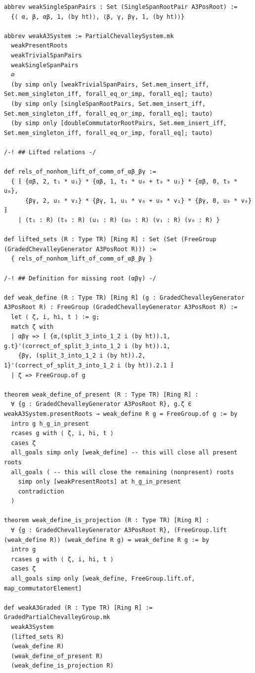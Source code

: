 \documentclass[10pt,a4paper]{article}
\begin{document}
\begin{Verbatim}
abbrev weakSingleSpanPairs : Set (SingleSpanRootPair A3PosRoot) :=
  {⟨ α, β, αβ, 1, (by ht)⟩, ⟨β, γ, βγ, 1, (by ht)⟩}

abbrev weakA3System := PartialChevalleySystem.mk
  weakPresentRoots
  weakTrivialSpanPairs
  weakSingleSpanPairs
  ∅
  (by simp only [weakTrivialSpanPairs, Set.mem_insert_iff, Set.mem_singleton_iff, forall_eq_or_imp, forall_eq]; tauto)
  (by simp only [singleSpanRootPairs, Set.mem_insert_iff, Set.mem_singleton_iff, forall_eq_or_imp, forall_eq]; tauto)
  (by simp only [doubleCommutatorRootPairs, Set.mem_insert_iff, Set.mem_singleton_iff, forall_eq_or_imp, forall_eq]; tauto)

/-! ## Lifted relations -/

def rels_of_nonhom_lift_of_comm_of_αβ_βγ :=
  { ⁅ {αβ, 2, t₁ * u₁} * {αβ, 1, t₁ * u₀ + t₀ * u₁} * {αβ, 0, t₀ * u₀},
      {βγ, 2, u₁ * v₁} * {βγ, 1, u₁ * v₀ + u₀ * v₁} * {βγ, 0, u₀ * v₀} ⁆
    | (t₁ : R) (t₀ : R) (u₁ : R) (u₀ : R) (v₁ : R) (v₀ : R) }

def lifted_sets (R : Type TR) [Ring R] : Set (Set (FreeGroup (GradedChevalleyGenerator A3PosRoot R))) :=
  { rels_of_nonhom_lift_of_comm_of_αβ_βγ }

/-! ## Definition for missing root (αβγ) -/

def weak_define (R : Type TR) [Ring R] (g : GradedChevalleyGenerator A3PosRoot R) : FreeGroup (GradedChevalleyGenerator A3PosRoot R) :=
  let ⟨ ζ, i, hi, t ⟩ := g;
  match ζ with
  | αβγ => ⁅ {α,(split_3_into_1_2 i (by ht)).1, g.t}'(correct_of_split_3_into_1_2 i (by ht)).1,
    {βγ, (split_3_into_1_2 i (by ht)).2, 1}'(correct_of_split_3_into_1_2 i (by ht)).2.1 ⁆
  | ζ => FreeGroup.of g

theorem weak_define_of_present (R : Type TR) [Ring R] :
  ∀ {g : GradedChevalleyGenerator A3PosRoot R}, g.ζ ∈ weakA3System.presentRoots → weak_define R g = FreeGroup.of g := by
  intro g h_g_in_present
  rcases g with ⟨ ζ, i, hi, t ⟩
  cases ζ
  all_goals simp only [weak_define] -- this will close all present roots
  all_goals ( -- this will close the remaining (nonpresent) roots
    simp only [weakPresentRoots] at h_g_in_present
    contradiction
  )

theorem weak_define_is_projection (R : Type TR) [Ring R] :
  ∀ {g : GradedChevalleyGenerator A3PosRoot R}, (FreeGroup.lift (weak_define R)) (weak_define R g) = weak_define R g := by
  intro g
  rcases g with ⟨ ζ, i, hi, t ⟩
  cases ζ
  all_goals simp only [weak_define, FreeGroup.lift.of, map_commutatorElement]

def weakA3Graded (R : Type TR) [Ring R] := GradedPartialChevalleyGroup.mk
  weakA3System
  (lifted_sets R)
  (weak_define R)
  (weak_define_of_present R)
  (weak_define_is_projection R)


\end{Verbatim}
\end{document}
